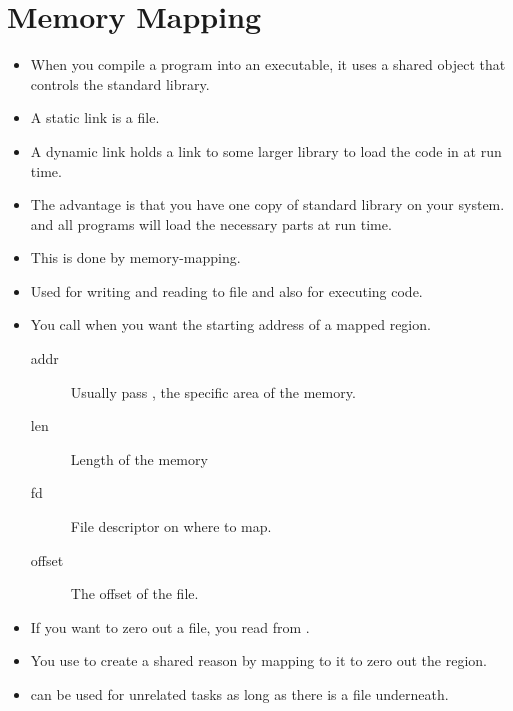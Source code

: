 \documentclass[]{article}
\begin{document}
\section{Memory Mapping}
\begin{itemize}
\item When you compile a program into an executable, it uses a shared object
that controls the standard library.
\item A static link is a  file.
\item A dynamic link holds a link to some larger library to load the code in at
run time.
\item The advantage is that you have one copy of standard library on your
system. and all programs will load the necessary parts at run time.
\item This is done by memory-mapping.
\item Used for writing and reading to file and also for executing code.
\item You call  when you want the starting address of a mapped
region.
\begin{description}
\item[addr] Usually pass , the specific area of the memory.
\item[len] Length of the memory
\item[fd] File descriptor on where to map.
\item[offset] The offset of the file.
\end{description}
\item If you want to zero out a file, you read from .
\item You use  to create a shared reason by mapping 
to it to zero out the region.
\item {} can be used for unrelated tasks as long as there is a file underneath.
\end{itemize}
\end{document}
